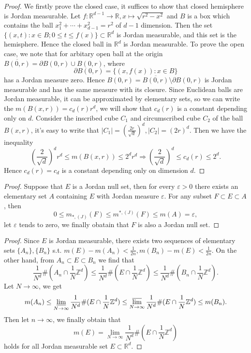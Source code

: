\documentclass{article}
\begin{document}
\setcounter{ex}{9}
\begin{ex}\end{ex}
\begin{proof}
We firstly prove the closed case, it suffices to show that closed hemisphere is Jordan measurable.
Let $f: \mathbb{R}^{d - 1} \to \mathbb{R}, x \mapsto \sqrt{r^2 - x^2}$ and $B$ is a box which contains the ball 
$x_1^2 + \cdots + x_{d - 1}^2 = r^2$ of $d - 1$ dimension. Then the set 
$\{(x, t): x \in B; 0 \leq t \leq f(x) \} \subset \mathbb{R}^d$ is Jordan measurable, and this set is the hemisphere.
Hence the closed ball in $\mathbb{R}^d$ is Jordan measurable. To prove the open case, we note that for arbitary open ball
at the origin $\overline{B(0, r)} = \partial B(0, r) \cup B(0, r)$, where $$
\partial B(0, r) = \{(x, f(x)): x \in B\}
$$ has a Jordan measure zero. Hence $B(0, r) = \overline{B(0, r)} \setminus \partial B(0, r)$ is Jordan measurable 
and has the same measure with its closure. Since Euclidean balls are Jordan measurable, it can be approximated by
elementary sets, so we can write the $m(B(x, r)) = c_d(r)r^d$, we will show that $c_d(r)$ is a constant depending
only on $d$. Consider the inscribed cube $C_1$ and circumscribed cube $C_2$ of the ball $B(x, r)$, it's easy to 
write that $|C_1| = (\frac{2r}{\sqrt{d}})^d, |C_2| = (2r)^d$. Then we have the inequality $$
\left( \frac{2}{\sqrt{d}} \right)^d r^d \leq m(B(x, r)) \leq 2^d r^d \Rightarrow 
\left( \frac{2}{\sqrt{d}} \right)^d \leq c_d(r) \leq 2^d.
$$Hence $c_d(r) = c_d$ is a constant depending only on dimension $d$.
\end{proof}

\setcounter{ex}{11}
\begin{ex}\end{ex}
\begin{proof}
Suppose that $E$ is a Jordan null set, then for every $\varepsilon > 0$ there exists an elementary set $A$ 
containing $E$ with Jordan measure $\varepsilon$. For any subset $F \subset E \subset A$, then$$
0 \leq m_{*,(J)}(F) \leq m^{*, (J)}(F) \leq m(A) = \varepsilon,
$$let $\varepsilon$ tends to zero, we finally obatain that $F$ is also a Jordan null set.
\end{proof}

\begin{ex}\end{ex}
\begin{proof}
Since $E$ is Jordan measurable, there exists two sequences of elementary sets $\{A_n\}, \{B_n\}$ s.t. $m(E) - m(A_n) < 
\frac{1}{2n}, m(B_n) - m(E) < \frac{1}{2n}$. On the other hand, from $A_n \subset E \subset B_n$ we find that $$
\frac{1}{N^d}\#(A_n \cap \frac{1}{N}\mathbb{Z}^d) \leq \frac{1}{N^d}\#(E \cap \frac{1}{N}\mathbb{Z}^d) \leq 
\frac{1}{N^d}\#(B_n \cap \frac{1}{N}\mathbb{Z}^d).
$$Let $N \to \infty$, we get $$
m(A_n) \leq \varliminf_{N \to \infty} \frac{1}{N^d}\#(E \cap \frac{1}{N}\mathbb{Z}^d) \leq 
\varlimsup_{N \to \infty} \frac{1}{N^d}\#(E \cap \frac{1}{N}\mathbb{Z}^d) \leq m(B_n).
$$Then let $n \to \infty$, we finally obtain that $$
m(E) = \lim_{N \to \infty} \frac{1}{N^d}\#(E \cap \frac{1}{N}\mathbb{Z}^d)
$$holds for all Jordan measurable set $E \subset \mathbb{R}^d$.
\end{proof}
\end{document}
